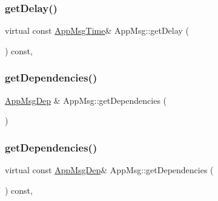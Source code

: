 \mbox{\label{classAppMsg_ac735d5e96a9c7fe0281d617820d7b533}} 
\subsubsection{\texorpdfstring{get\+Delay()}{getDelay()}\hspace{0.1cm}{\footnotesize\ttfamily [2/2]}}
{\footnotesize\ttfamily virtual const \hyperlink{AppMsg__m_8h_afd955b091e7d9b98cff80a090db1eb09}{App\+Msg\+Time}\& App\+Msg\+::get\+Delay (\begin{DoxyParamCaption}{ }\end{DoxyParamCaption}) const\hspace{0.3cm}{\ttfamily [inline]}, {\ttfamily [virtual]}}

\mbox{\label{classAppMsg_ae767d2a50a7b279bdecf457fd047125a}} 
\subsubsection{\texorpdfstring{get\+Dependencies()}{getDependencies()}\hspace{0.1cm}{\footnotesize\ttfamily [1/2]}}
{\footnotesize\ttfamily \hyperlink{AppMsg__m_8h_a39bb58326d7e24febcd7397c022ada6a}{App\+Msg\+Dep} \& App\+Msg\+::get\+Dependencies (\begin{DoxyParamCaption}{ }\end{DoxyParamCaption})\hspace{0.3cm}{\ttfamily [virtual]}}

\mbox{\label{classAppMsg_a453ca3d6502f7f82020c7ef2787a45c7}} 
\subsubsection{\texorpdfstring{get\+Dependencies()}{getDependencies()}\hspace{0.1cm}{\footnotesize\ttfamily [2/2]}}
{\footnotesize\ttfamily virtual const \hyperlink{AppMsg__m_8h_a39bb58326d7e24febcd7397c022ada6a}{App\+Msg\+Dep}\& App\+Msg\+::get\+Dependencies (\begin{DoxyParamCaption}{ }\end{DoxyParamCaption}) const\hspace{0.3cm}{\ttfamily [inline]}, {\ttfamily [virtual]}}

